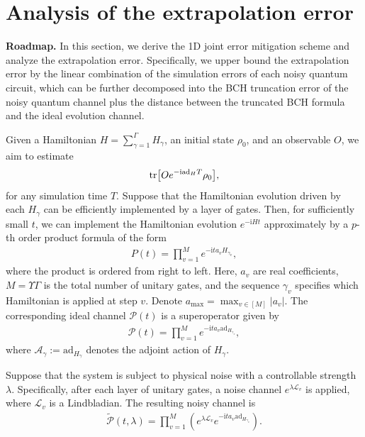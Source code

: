 \documentclass[11pt]{article}
\renewcommand{\i}{\mathrm{i}}
\newcommand{\ad}{\mathrm{ad}}
\renewcommand{\P}{\mathcal{P}}
\newcommand{\A}{\mathcal{A}}
\newcommand{\mc}{\mathcal}
\newcommand{\xz}[1]{{\color{cyan} XZ: #1}}
\newcommand{\sz}[1]{{\color{blue} Shuo: #1}}
\begin{document}
\section{Analysis of the extrapolation error}
\textbf{Roadmap.} In this section, we derive the 1D joint error mitigation scheme and analyze the extrapolation error. Specifically, we upper bound the extrapolation error by the linear combination of the simulation errors of each noisy quantum circuit, which can be further decomposed into the BCH truncation error of the noisy quantum channel plus the distance between the truncated BCH formula and the ideal evolution channel.

Given a Hamiltonian $H = \sum_{\gamma=1}^{\Gamma} H_{\gamma}$, an initial state $\rho_0$, and an observable $O$, we aim to estimate \begin{align*}
    \tr[Oe^{-\i \ad_H T} \rho_0],
\end{align*}
for any simulation time $T$.
Suppose that the Hamiltonian evolution driven by each $H_{\gamma}$ can be efficiently implemented by a layer of gates. Then, for sufficiently small $t$, we can implement the Hamiltonian evolution $e^{-\i H t}$ approximately by a $p$-th order product formula of the form
\begin{align*}
    P(t) = \prod_{v=1}^Me^{-\i t a_{v} H_{\gamma_v}},
\end{align*}
where the product is ordered from right to left. Here, $a_{v}$ are real coefficients, $M = \Upsilon\Gamma$ is the total number of unitary gates, and the sequence $\gamma_v$ specifies which Hamiltonian is applied at step $v$. Denote $a_{\max} = \max_{v\in [M]} |a_v|$. The corresponding ideal channel $\P(t)$ is a superoperator given by
\begin{align*}
    \P(t) = \prod_{v=1}^Me^{-\i t a_{v} \ad_{H_{\gamma_v}}},
\end{align*}
where $\A_{\gamma}:=\ad_{H_{\gamma}}$ denotes the adjoint action of $H_{\gamma}$. 

Suppose that the system is subject to physical noise with a controllable strength $\lambda$. Specifically, after each layer of unitary gates, a noise channel $e^{\lambda \mc L_{v}}$ is applied, where $\mc L_{v}$ is a Lindbladian. The resulting noisy channel is
\begin{align*}
    \tilde{\P}(t,\lambda)=\prod_{v=1}^M\left( e^{\lambda \mc L_{v}} e^{-\i t a_{v} \ad_{H_{\gamma_v}}} \right).
\end{align*} 
\end{document}
